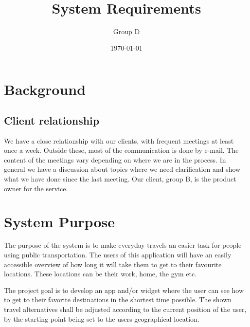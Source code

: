 \documentclass[a4paper]{article}
\title{System Requirements}
\author{Group D}
\date{\today}
\begin{document}
	\maketitle
	\thispagestyle{empty}
	\setcounter{page}{0}
	\pagebreak
	\tableofcontents
	\pagebreak
	



	\section{Background} %
	\label{sec:background}
	
		\subsection{Client relationship}
			We have a close relationship with our clients, with frequent meetings at least once a week. Outside these, most of the communication is done by e-mail. The content of the meetings vary depending on where we are in the process. In general we have a discussion about topics where we need clarification and show what we have done since the last meeting.
Our client, group B, is the product owner for the service.


	\section{System Purpose} %
	The purpose of the system is to make everyday travels an easier task for people using public transportation. The users of this application will have an easily accessible overview of how long it will take them to get to their favourite locations. These locations can be their work, home, the gym etc.
	
	
The project goal is to develop an app and/or widget where the user can see how to get to their favorite destinations in the shortest time possible. The shown travel alternatives shall be adjusted according to the current position of the user, by the starting point being set to the users geographical location.
\end{document}
